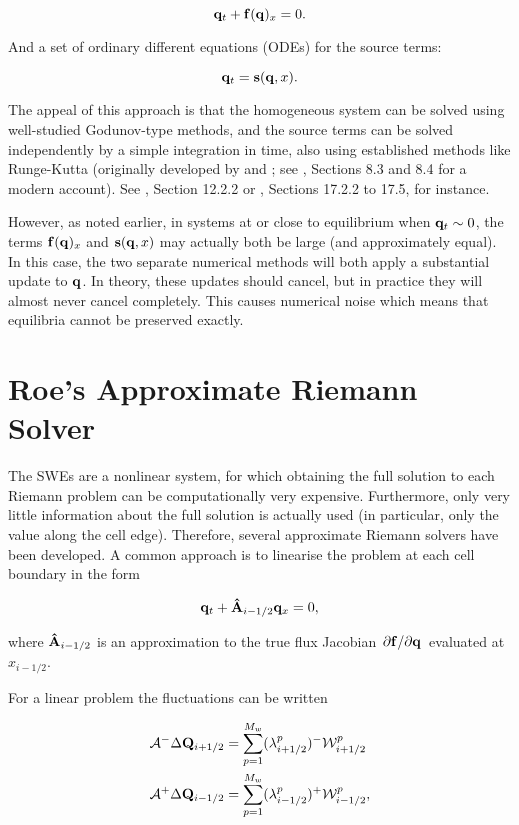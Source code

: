 $$
  \vb q_t + \vb f(\vb q)_x = 0.
$$

And a set of ordinary different equations (ODEs) for the source terms:

$$
  \vb q_t = \vb s(\vb q, x).
$$

The appeal of this approach is that the homogeneous system can be solved using well-studied Godunov-type methods, and the source terms can be solved independently by a simple integration in time, also using established methods like Runge-Kutta (originally developed by \citet{runge1895numerische} and \citet{kutta1901beitrag}; see \citet{kaw2009numerical}, Sections 8.3 and 8.4 for a modern account). See \citet{toro2001shock}, Section 12.2.2 or \citet{leveque2002finite}, Sections 17.2.2 to 17.5, for instance.

However, as noted earlier, in systems at or close to equilibrium when $\vb q_t \sim 0$, the terms $\vb f(\vb q)_x$ and $\vb s(\vb q, x)$ may actually both be large (and approximately equal). In this case, the two separate numerical methods will both apply a substantial update to $\vb q$. In theory, these updates should cancel, but in practice they will almost never cancel completely. This causes numerical noise which means that equilibria cannot be preserved exactly.

\section{Roe's Approximate Riemann Solver}
\label{sec:roe}

The SWEs are a nonlinear system, for which obtaining the full solution to each Riemann problem can be computationally very expensive. Furthermore, only very little information about the full solution is actually used (in particular, only the value along the cell edge). Therefore, several approximate Riemann solvers have been developed. A common approach is to linearise the problem at each cell boundary in the form

\begin{align}
  \vb q_t + \vu A_{i-1/2} \vb q_x = 0,
\end{align}

where $\vu A_{i-1/2}$ is an approximation to the true flux Jacobian $\pdv*{\vb f}{\vb q}$ evaluated at $x_{i-1/2}$.

For a linear problem the fluctuations can be written

\begin{subequations}
  \label{eq:approx_fluct}
\begin{align}
  \mathcal{A}^- \Delta \vb Q_{i+1/2} &= \sum_{p=1}^{M_w} (\lambda_{i+1/2}^p)^- \mathcal{W}_{i+1/2}^p \\
  \mathcal{A}^+ \Delta \vb Q_{i-1/2} &= \sum_{p=1}^{M_w} (\lambda_{i-1/2}^p)^+ \mathcal{W}_{i-1/2}^p,
\end{align}
\end{subequations}

